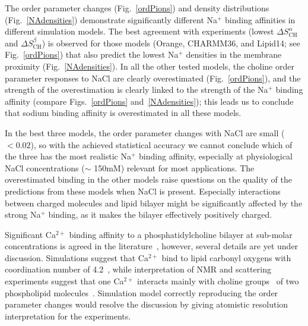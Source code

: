 \documentclass[twoside,twocolumn,9pt]{article}
\begin{document}
The order parameter changes (Fig.~\ref{ordPions}) and density distributions (Fig.~\ref{NAdensities})
demonstrate significantly different Na$^+$ binding affinities in different simulation models.
The best agreement with experiments (lowest $\Delta S_\mathrm{CH}^\alpha$ and $\Delta S_\mathrm{CH}^\beta$) is observed for those models (Orange, CHARMM36, and Lipid14; see Fig.~\ref{ordPions}) that also predict the lowest Na$^+$ densities 
in the membrane proximity (Fig.~\ref{NAdensities}).
In all the other tested models, the choline order parameter 
responses to NaCl are clearly overestimated (Fig.~\ref{ordPions}),
and the strength of the overestimation is clearly linked to the strength of the
Na$^+$ binding affinity (compare Figs.~\ref{ordPions} and~\ref{NAdensities});
this leads us to
conclude that sodium binding affinity is overestimated in all these models.


In the best three models, the order parameter changes with NaCl are small ($<0.02$), so
with the achieved statistical accuracy we cannot conclude 
which of the three has the most realistic Na$^+$ binding affinity,
especially at physiological NaCl concentrations ($\sim$ 150mM) 
relevant for most applications. 
The overestimated binding in the other models raise questions on the quality of the predictions from these models when NaCl is present.
Especially interactions between charged molecules and lipid bilayer might be significantly
affected by the strong Na$^+$ binding, as it makes the bilayer effectively positively charged.

Significant Ca$^{2+}$ binding affinity to a phosphatidylcholine bilayer at sub-molar concentrations  
is agreed in the literature~\cite{akutsu81,altenbach84,cevc90,tocanne90}, however, several
details are yet under discussion. Simulations suggest that Ca$^{2+}$ bind to lipid carbonyl
oxygens with coordination number of 4.2~\cite{bockmann04}, while interpretation of NMR and 
scattering experiments suggest that one Ca$^{2+}$ interacts mainly with choline 
groups~\cite{hauser76,hauser78,herbette84} of two phospholipid molecules~\cite{altenbach84}. 
Simulation model correctly reproducing the order parameter changes would resolve the discussion
by giving atomistic resolution interpretation for the experiments.
\end{document}
